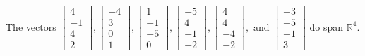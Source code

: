 \begin{exercise}
\begin{exerciseStatement}
  \end{exerciseStatement}
  \begin{exerciseAnswer}
   The vectors \(\left[\begin{array}{r}
4 \\
-1 \\
4 \\
2
\end{array}\right] , \left[\begin{array}{r}
-4 \\
3 \\
0 \\
1
\end{array}\right] , \left[\begin{array}{r}
1 \\
-1 \\
-5 \\
0
\end{array}\right] , \left[\begin{array}{r}
-5 \\
4 \\
-1 \\
-2
\end{array}\right] , \left[\begin{array}{r}
4 \\
4 \\
-4 \\
-2
\end{array}\right] , \text{ and } \left[\begin{array}{r}
-3 \\
-5 \\
-1 \\
3
\end{array}\right]\) 
  	 do  
	span \(\mathbb{R}^4\).
  


  \end{exerciseAnswer}
\end{exercise}